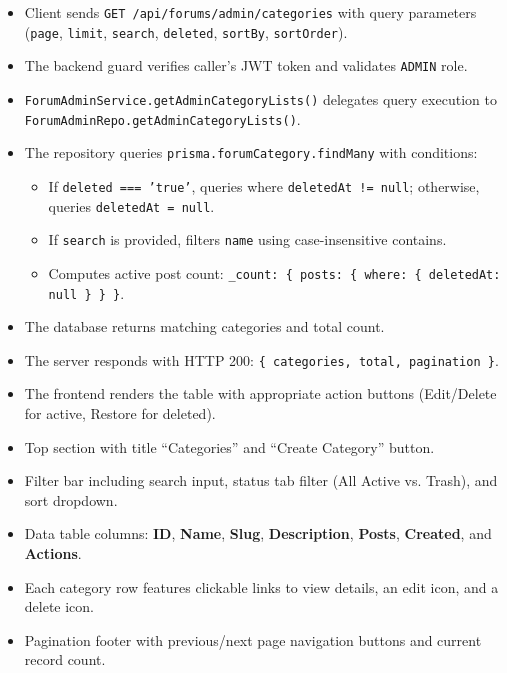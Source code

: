 \begin{itemize}[leftmargin=1.6em,topsep=3pt,itemsep=2pt,parsep=0pt,label=$\bullet$]
    \item Client sends \texttt{GET /api/forums/admin/categories} with query parameters (\texttt{page}, \texttt{limit}, \texttt{search}, \texttt{deleted}, \texttt{sortBy}, \texttt{sortOrder}).
    \item The backend guard verifies caller's JWT token and validates \texttt{ADMIN} role.
    \item \texttt{ForumAdminService.getAdminCategoryLists()} delegates query execution to \texttt{ForumAdminRepo.getAdminCategoryLists()}.
    \item The repository queries \texttt{prisma.forumCategory.findMany} with conditions:
        \begin{itemize}[leftmargin=1.6em,topsep=2pt,itemsep=2pt,parsep=0pt]
            \item If \texttt{deleted === 'true'}, queries where \texttt{deletedAt != null}; otherwise, queries \texttt{deletedAt = null}.
            \item If \texttt{search} is provided, filters \texttt{name} using case-insensitive contains.
            \item Computes active post count: \texttt{\_count: \{ posts: \{ where: \{ deletedAt: null \} \} \}}.
        \end{itemize}
    \item The database returns matching categories and total count.
    \item The server responds with HTTP 200: \texttt{\{ categories, total, pagination \}}.
    \item The frontend renders the table with appropriate action buttons (Edit/Delete for active, Restore for deleted).
\end{itemize}

\begin{itemize}[leftmargin=1.6em,topsep=3pt,itemsep=2pt,parsep=0pt,label=$\bullet$]
    \item Top section with title ``Categories'' and ``Create Category'' button.
    \item Filter bar including search input, status tab filter (All Active vs. Trash), and sort dropdown.
    \item Data table columns: \textbf{ID}, \textbf{Name}, \textbf{Slug}, \textbf{Description}, \textbf{Posts}, \textbf{Created}, and \textbf{Actions}.
    \item Each category row features clickable links to view details, an edit icon, and a delete icon.
    \item Pagination footer with previous/next page navigation buttons and current record count.
\end{itemize}

